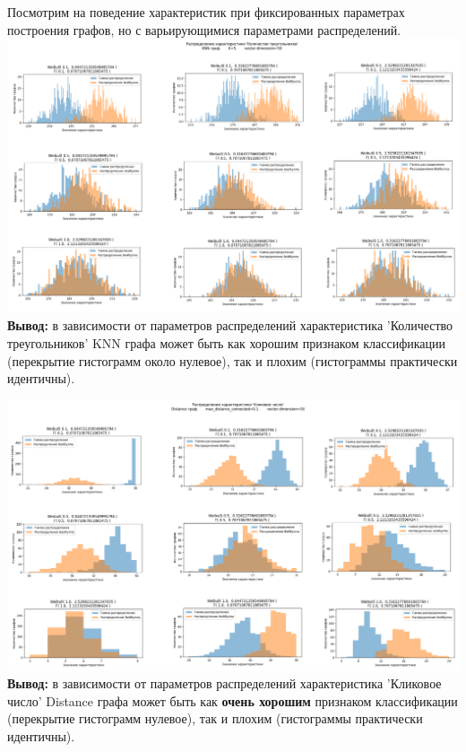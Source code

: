 Посмотрим на поведение характеристик при фиксированных параметрах построения графов, но с варьирующимися параметрами распределений.\\

\hspace*{-1cm}
\includegraphics[width=1\textwidth]{Part-I_student-2/point 1_histogram_KNN.png}\\ 

\noindent\textbf{Вывод:} в зависимости от параметров распределений характеристика 'Количество треугольников' KNN графа может быть как хорошим признаком классификации (перекрытие гистограмм около нулевое), так и плохим (гистограммы практически идентичны).


\hspace*{-1cm}
\includegraphics[width=1\textwidth]{Part-I_student-2/point 1_histogram_Dist.png}\\ 

\noindent\textbf{Вывод:} в зависимости от параметров распределений характеристика 'Кликовое число' Distance графа может быть как \textbf{очень хорошим} признаком классификации (перекрытие гистограмм нулевое), так и плохим (гистограммы практически идентичны).